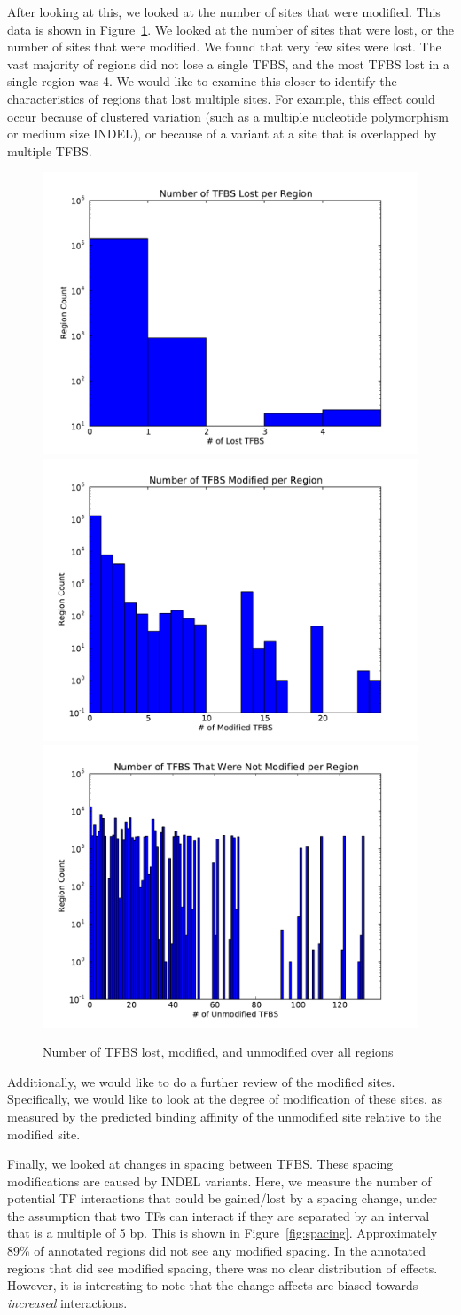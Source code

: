 \documentclass[11pt]{article}
\theoremstyle{plain}
\begin{document}
After looking at this, we looked at the number of sites that were modified. This
data is shown in Figure~\ref{fig:sites}. We looked at the number of sites that
were lost, or the number of sites that were modified. We found that very few sites
were lost. The vast majority of regions did not lose a single TFBS, and the most
TFBS lost in a single region was 4. We would like to examine this closer to identify
the characteristics of regions that lost multiple sites. For example, this effect
could occur because of clustered variation (such as a multiple nucleotide polymorphism
or medium size INDEL), or because of a variant at a site that is overlapped by
multiple TFBS.

\begin{figure}[h]
\begin{center}
\includegraphics[width=0.25\linewidth]{graphs/lost-sites.pdf}
\includegraphics[width=0.25\linewidth]{graphs/mod-sites.pdf}
\includegraphics[width=0.25\linewidth]{graphs/unmod-sites.pdf}
\end{center}
\caption{Number of TFBS lost, modified, and unmodified over all regions}
\label{fig:sites}
\end{figure}

Additionally, we would like to do a further review of the modified sites. Specifically,
we would like to look at the degree of modification of these sites, as measured by
the predicted binding affinity of the unmodified site relative to the modified site.

Finally, we looked at changes in spacing between TFBS. These spacing modifications
are caused by INDEL variants. Here, we measure the number of potential TF interactions
that could be gained/lost by a spacing change, under the assumption that two TFs can
interact if they are separated by an interval that is a multiple of 5 bp. This is
shown in Figure~\ref{fig:spacing}. Approximately 89\% of annotated regions did not
see any modified spacing. In the annotated regions that did see modified spacing,
there was no clear distribution of effects. However, it is interesting to note that
the change affects are biased towards \emph{increased} interactions. 
\end{document}
